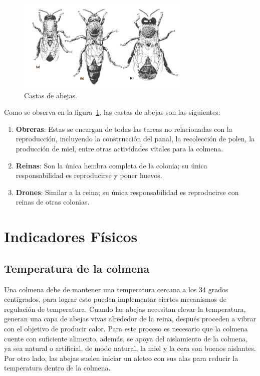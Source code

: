 \begin{figure}[htbp]
    \centering
    \includegraphics[width=0.75\textwidth]{assets/abejas.png}
    \caption{Castas de abejas. \cite{david_cramp}}
    \label{fig:abejas}
\end{figure}

Como se observa en la figura~\ref{fig:abejas}, las castas de abejas son las siguientes:
\begin{enumerate}
    \renewcommand\labelenumi{\alph{enumi})}
    \item \textbf{Obreras}: Estas se encargan de todas las tareas no relacionadas con la reproducción, incluyendo la construcción del panal, la recolección de polen, la producción de miel, entre otras actividades vitales para la colmena.
    \item \textbf{Reinas}: Son la única hembra completa de la colonia; su única responsabilidad es reproducirse y poner huevos.
    \item \textbf{Drones}: Similar a la reina; su única responsabilidad es reproducirse con reinas de otras colonias.
\end{enumerate}
\section{Indicadores Físicos}

\subsection{Temperatura de la colmena}
Una colmena debe de mantener una temperatura cercana a los 34 grados centígrados, para lograr esto pueden implementar ciertos mecanismos de regulación de temperatura. \cite{david_cramp}
Cuando las abejas necesitan elevar la temperatura, generan una capa de abejas vivas alrededor de la reina, después proceden a vibrar con el objetivo de producir calor. Para este proceso es necesario que la colmena cuente con suficiente alimento, además, se apoya del aislamiento de la colmena, ya sea natural o artificial, de modo natural, la miel y la cera son buenos aislantes. \cite{chadwick_alton_tennant_fitzmaurice_earl_2016}
Por otro lado, las abejas suelen iniciar un aleteo con sus alas para reducir la temperatura dentro de la colmena. \cite{chadwick_alton_tennant_fitzmaurice_earl_2016}

